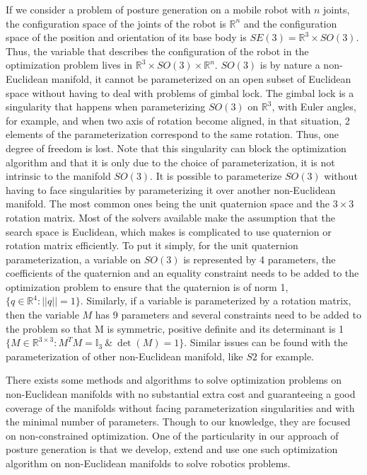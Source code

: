 If we consider a problem of posture generation on a mobile robot with $n$ joints, the configuration space of the joints of the robot is $\mathbb{R}^n$ and the configuration space of the position and orientation of its base body is $SE(3) = \mathbb{R}^3\times SO(3)$.
Thus, the variable that describes the configuration of the robot in the optimization problem lives in $\mathbb{R}^3\times SO(3) \times \mathbb{R}^n$.
$SO(3)$ is by nature a non-Euclidean manifold, it cannot be parameterized on an open subset of Euclidean space without having to deal with problems of gimbal lock.
The gimbal lock is a singularity that happens when parameterizing $SO(3)$ on $\mathbb{R}^3$, with Euler angles, for example, and when two axis of rotation become aligned, in that situation, 2 elements of the parameterization correspond to the same rotation.
Thus, one degree of freedom is lost.
Note that this singularity can block the optimization algorithm and that it is only due to the choice of parameterization, it is not intrinsic to the manifold $SO(3)$.
It is possible to parameterize $SO(3)$ without having to face singularities by parameterizing it over another non-Euclidean manifold.
The most common ones being the unit quaternion space and the $3\times 3$ rotation matrix.
Most of the solvers available make the assumption that the search space is Euclidean, which makes is complicated to use quaternion or rotation matrix efficiently.
To put it simply, for the unit quaternion parameterization, a variable on $SO(3)$ is represented by 4 parameters, the coefficients of the quaternion and an equality constraint needs to be added to the optimization problem to ensure that the quaternion is of norm 1, $\{q\in\mathbb{R}^4:||q||=1\}$.
Similarly, if a variable is parameterized by a rotation matrix, then the variable $M$ has 9 parameters and several constraints need to be added to the problem so that M is symmetric, positive definite and its determinant is 1 $\{M\in\mathbb{R}^{3\times 3}:M^TM = \mathbb{I}_3\  \&\ \det (M) = 1\}$.
Similar issues can be found with the parameterization of other non-Euclidean manifold, like $S2$ for example.

There exists some methods and algorithms to solve optimization problems on non-Euclidean manifolds with no substantial extra cost and guaranteeing a good coverage of the manifolds without facing parameterization singularities and with the minimal number of parameters.
Though to our knowledge, they are focused on non-constrained optimization.
One of the particularity in our approach of posture generation is that we develop, extend and use one such optimization algorithm on non-Euclidean manifolds to solve robotics problems.

